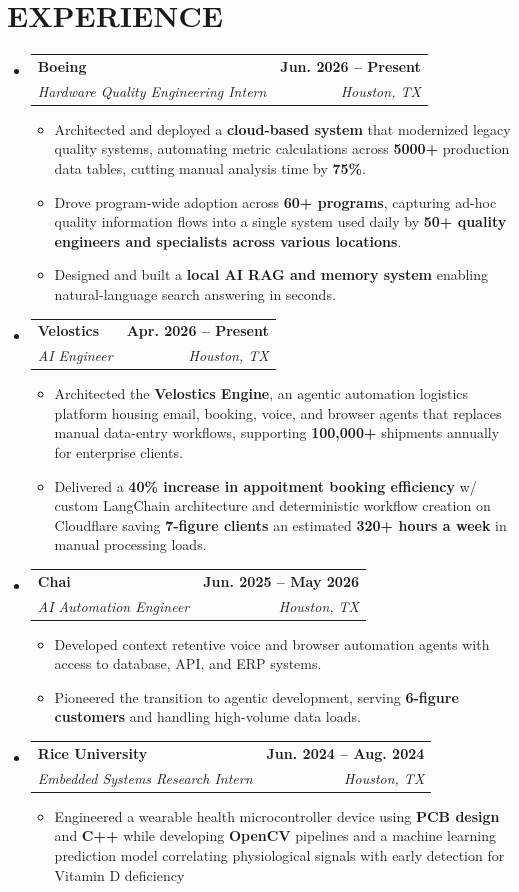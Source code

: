 \documentclass[letterpaper,11pt]{article}
\makeatletter
\newcommand{\resumeItem}[1]{
  \item\small{
    {#1 \vspace{-2pt}}
  }
}
\newcommand{\resumeSubheading}[4]{
  \vspace{-2pt}\item
    \begin{tabular*}{1.0\textwidth}[t]{l@{\extracolsep{\fill}}r}
      \textbf{#1} & \textbf{\small #2} \\
      \textit{\small#3} & \textit{\small #4} \\
    \end{tabular*}\vspace{-7pt}
}
\newcommand{\resumeSubHeadingListStart}{\begin{itemize}[leftmargin=0.0in, label={}]}
\newcommand{\resumeSubHeadingListEnd}{\end{itemize}}
\newcommand{\resumeItemListStart}{\begin{itemize}}
\newcommand{\resumeItemListEnd}{\end{itemize}\vspace{-5pt}}
\makeatother
\begin{document}
\section{EXPERIENCE}
  \resumeSubHeadingListStart
    \resumeSubheading
      {Boeing}{Jun. 2026 -- Present}
      {Hardware Quality Engineering Intern}{Houston, TX}
      \resumeItemListStart
        \resumeItem{Architected and deployed a \textbf{cloud-based system} that modernized legacy quality systems, automating metric calculations across \textbf{5000+} production data tables, cutting manual analysis time by \textbf{75\%}.}
        \resumeItem{Drove program-wide adoption across \textbf{60+ programs}, capturing ad-hoc quality information flows into a single system used daily by \textbf{50+ quality engineers and specialists across various locations}.}
        \resumeItem{Designed and built a \textbf{local AI RAG and memory system} enabling natural-language search answering in seconds.}
      \resumeItemListEnd
    \resumeSubheading
      {Velostics}{Apr. 2026 -- Present}
      {AI Engineer}{Houston, TX}
      \resumeItemListStart
        \resumeItem{Architected the \textbf{Velostics Engine}, an agentic automation logistics platform  housing email, booking, voice, and browser agents that replaces manual data-entry workflows, supporting \textbf{100,000+} shipments annually for enterprise clients.}
        \resumeItem{Delivered a \textbf{40\% increase in appoitment booking efficiency} w/ custom LangChain architecture and deterministic workflow creation on Cloudflare saving \textbf{7-figure clients} an estimated \textbf{320+ hours a week} in manual processing loads.}
      \resumeItemListEnd
    \resumeSubheading
      {Chai}{Jun. 2025 -- May 2026}
      {AI Automation Engineer}{Houston, TX}
      \resumeItemListStart
        \resumeItem{Developed context retentive voice and browser automation agents with access to database, API, and ERP systems.}
        \resumeItem{Pioneered the transition to agentic development, serving \textbf{6-figure customers} and handling high-volume data loads.}
      \resumeItemListEnd
    \resumeSubheading
      {Rice University}{Jun. 2024 -- Aug. 2024}
      {Embedded Systems Research Intern}{Houston, TX}
      \resumeItemListStart
        \resumeItem{Engineered a wearable health microcontroller device using \textbf{PCB design} and \textbf{C++} while developing \textbf{OpenCV} pipelines and a machine learning prediction model correlating physiological signals with early detection for Vitamin D deficiency }
      \resumeItemListEnd
  \resumeSubHeadingListEnd
\vspace{-16pt}
\end{document}
